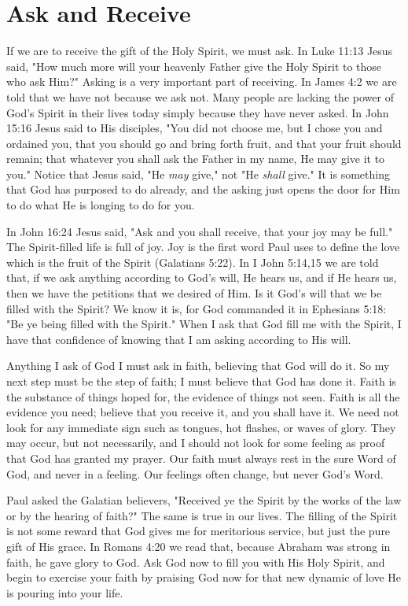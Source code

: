 \section*{Ask and Receive}

If we are to receive the gift of the Holy Spirit, we must ask. In Luke 11:13 Jesus said, "How much more will your heavenly Father give the Holy Spirit to those who ask Him?" Asking is a very important part of receiving. In James 4:2 we are told that we have not because we ask not. Many people are lacking the power of God's Spirit in their lives today simply because they have never asked. In John 15:16 Jesus said to His disciples, "You did not choose me, but I chose you and ordained you, that you should go and bring forth fruit, and that your fruit should remain; that whatever you shall ask the Father in my name, He may give it to you." Notice that Jesus said, "He \emph{may} give," not "He \emph{shall} give." It is something that God has purposed to do already, and the asking just opens the door for Him to do what He is longing to do for you. 

In John 16:24 Jesus said, "Ask and you shall receive, that your joy may be full." The Spirit-filled life is full of joy. Joy is the first word Paul uses to define the love which is the fruit of the Spirit (Galatians 5:22). In I John 5:14,15 we are told that, if we ask anything according to God's will, He hears us, and if He hears us, then we have the petitions that we desired of Him. Is it God's will that we be filled with the Spirit? We know it is, for God commanded it in Ephesians 5:18: "Be ye being filled with the Spirit." When I ask that God fill me with the Spirit, I have that confidence of knowing that I am asking according to His will. 

Anything I ask of God I must ask in faith, believing that God will do it. So my next step must be the step of faith; I must believe that God has done it. Faith is the substance of things hoped for, the evidence of things not seen. Faith is all the evidence you need; believe that you receive it, and you shall have it. We need not look for any immediate sign such as tongues, hot flashes, or waves of glory. They may occur, but not necessarily, and I should not look for some feeling as proof that God has granted my prayer. Our faith must always rest in the sure Word of God, and never in a feeling. Our feelings often change, but never God's Word. 

Paul asked the Galatian believers, "Received ye the Spirit by the works of the law or by the hearing of faith?" The same is true in our lives. The filling of the Spirit is not some reward that God gives me for meritorious service, but just the pure gift of His grace. In Romans 4:20 we read that, because Abraham was strong in faith, he gave glory to God. Ask God now to fill you with His Holy Spirit, and begin to exercise your faith by praising God now for that new dynamic of love He is pouring into your life. 


